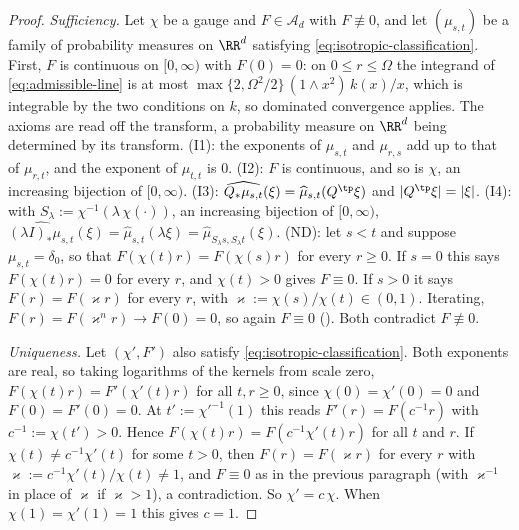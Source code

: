 \begin{proof}
\emph{Sufficiency.} Let $\chi$ be a gauge and $F \in \mathcal{A}_d$ with $F \not\equiv 0$, and let
$(\mu_{s,t})$ be a family of probability measures on $\RR^d$ satisfying
\ref{eq:isotropic-classification}. First, $F$ is
continuous on $[0,\infty)$ with $F(0) = 0$: on $0 \le r \le \Omega$ the integrand of
\ref{eq:admissible-line} is at most $\max\{2,\Omega^2/2\}\,(1 \wedge x^2)\,k(x)/x$, which is
integrable by the two conditions on $k$, so dominated convergence applies. The axioms are read off
the transform, a probability measure on $\RR^d$ being determined by its
transform. (I1): the exponents of $\mu_{s,t}$ and $\mu_{r,s}$ add up to that of $\mu_{r,t}$, and
the exponent of $\mu_{t,t}$ is $0$. (I2): $F$ is continuous, and so is $\chi$, an increasing
bijection of $[0,\infty)$. (I3): $\widehat{Q_*\mu_{s,t}}(\xi) = \widehat\mu_{s,t}(Q^{\tp}\xi)$ and
$|Q^{\tp}\xi| = |\xi|$. (I4): with $S_\lambda := \chi^{-1}(\lambda\,\chi(\cdot))$, an increasing
bijection of $[0,\infty)$,
$\widehat{(\lambda I)_*\mu_{s,t}}(\xi) = \widehat\mu_{s,t}(\lambda\xi)
= \widehat\mu_{S_\lambda s,S_\lambda t}(\xi)$. (ND): let $s < t$ and suppose
$\mu_{s,t} = \delta_0$, so that $F(\chi(t)r) = F(\chi(s)r)$ for every $r \ge 0$. If $s = 0$ this
says $F(\chi(t)r) = 0$ for every $r$, and $\chi(t) > 0$ gives $F \equiv 0$. If $s > 0$ it says
$F(r) = F(\varkappa r)$ for every $r$, with $\varkappa := \chi(s)/\chi(t) \in (0,1)$. Iterating,
$F(r) = F(\varkappa^nr) \to F(0) = 0$, so again $F \equiv 0$ (). Both contradict
$F \not\equiv 0$.

\emph{Uniqueness.} Let $(\chi',F')$ also satisfy \ref{eq:isotropic-classification}. Both exponents
are real, so taking logarithms of the kernels from scale zero, $F(\chi(t)r) = F'(\chi'(t)r)$ for
all $t, r \ge 0$, since $\chi(0) = \chi'(0) = 0$ and $F(0) = F'(0) = 0$. At $t' := \chi'^{-1}(1)$ this reads $F'(r) = F(c^{-1}r)$ with
$c^{-1} := \chi(t') > 0$. Hence $F(\chi(t)r) = F(c^{-1}\chi'(t)r)$ for all $t$ and $r$. If
$\chi(t) \ne c^{-1}\chi'(t)$ for some $t > 0$, then $F(r) = F(\varkappa r)$ for every $r$ with
$\varkappa := c^{-1}\chi'(t)/\chi(t) \ne 1$, and $F \equiv 0$ as in the previous paragraph (with
$\varkappa^{-1}$ in place of $\varkappa$ if $\varkappa > 1$), a contradiction. So
$\chi' = c\,\chi$. When $\chi(1) = \chi'(1) = 1$ this gives $c = 1$.
\end{proof}

